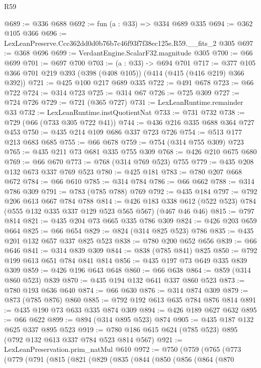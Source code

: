 \begin{lexlean}{R59}
\begin{coremodule}
@689 := @336 @688
@692 := fun (a : @33) => @334 @689 @335
@694 := @362 @105 @366
@696 := LexLeanPreserve.Ccc362dd0d0b76b7c46f93f7f38ec125e.R59.__fits_2 @305
@697 := @368 @696
@699 := VerdantEngine.ScalarF32.magnitude @305
@700 := @66 @699
@701 := @697 @700
@703 := (a : @33) -> @694 @701
@717 := @377 @105 @366 @701 @219 @393 (@398 (@408 @105)) (@414 (@415 (@416 @219) @366 @392))
@721 := @425 @100 @217 @689 @335
@722 := @491 @678
@723 := @66 @722
@724 := @314 @723
@725 := @314 @67
@726 := @725 @309
@727 := @724 @726
@729 := @721 (@365 @727)
@731 := LexLeanRuntime.remainder @33
@732 := LexLeanRuntime.instQuotientNat
@733 := @731 @732
@738 := @729 (@66 (@733 @305 @722 @41))
@744 := @436 @216 @335 @688 @364 @727 @453
@750 := @435 @214 @109 @686 @337 @723 @726
@754 := @513 @177 @213 @683 @685
@755 := @66 @678
@759 := @754 (@314 @755 @309) @723
@765 := @435 @211 @73 @681 @335 @755 @309
@768 := @426 @210 @675 @680
@769 := @66 @670
@773 := @768 (@314 @769 @523) @755
@779 := @435 @208 @132 @673 @337 @769 @523
@780 := @425 @181
@783 := @780 @207 @668 @672
@784 := @66 @610
@785 := @314 @784
@786 := @66 @662
@788 := @314 @786 @309
@791 := @783 (@785 @788) @769
@792 := @435 @184
@797 := @792 @206 @613 @667 @784 @788
@814 := @426
    @183
    @338
    @612
    (@522 @523)
    @784
    (@555 @132 @335 @337 @129 @523 @565 @567)
    (@467 @46 @46)
@815 := @797 @814
@821 := @435 @204 @73 @665 @335 @786 @309
@824 := @426 @203 @659 @664
@825 := @66 @654
@829 := @824 (@314 @825 @523) @786
@835 := @435 @201 @132 @657 @337 @825 @523
@838 := @780 @200 @652 @656
@839 := @66 @646
@841 := @314 @839 @309
@844 := @838 (@785 @841) @825
@850 := @792 @199 @613 @651 @784 @841 @814
@856 := @435 @197 @73 @649 @335 @839 @309
@859 := @426 @196 @643 @648
@860 := @66 @638
@864 := @859 (@314 @860 @523) @839
@870 := @435 @194 @132 @641 @337 @860 @523
@873 := @780 @193 @636 @640
@874 := @66 @630
@876 := @314 @874 @309
@879 := @873 (@785 @876) @860
@885 := @792 @192 @613 @635 @784 @876 @814
@891 := @435 @190 @73 @633 @335 @874 @309
@894 := @426 @189 @627 @632
@895 := @66 @622
@899 := @894 (@314 @895 @523) @874
@905 := @435 @187 @132 @625 @337 @895 @523
@919 := @780 @186 @615 @624 (@785 @523) @895 (@792 @132 @613 @337 @784 @523 @814 @567)
@921 := LexLeanPreservation.prim_natMul @610
@972 := @750
    (@759
      (@765
        (@773
          (@779
            (@791
              (@815
                (@821
                  (@829
                    (@835
                      (@844
                        (@850
                          (@856
                            (@864
                              (@870

\end{coremodule}
\end{lexlean}
